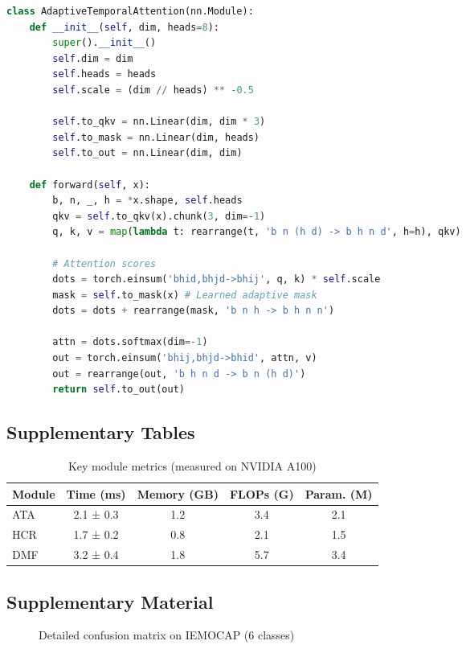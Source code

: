 \documentclass[a4paper,11pt]{article}
\begin{document}
\begin{lstlisting}[language=Python,caption=Adaptive Temporal Attention Module Excerpt]
class AdaptiveTemporalAttention(nn.Module):
    def __init__(self, dim, heads=8):
        super().__init__()
        self.dim = dim
        self.heads = heads
        self.scale = (dim // heads) ** -0.5
        
        self.to_qkv = nn.Linear(dim, dim * 3)
        self.to_mask = nn.Linear(dim, heads)
        self.to_out = nn.Linear(dim, dim)

    def forward(self, x):
        b, n, _, h = *x.shape, self.heads
        qkv = self.to_qkv(x).chunk(3, dim=-1)
        q, k, v = map(lambda t: rearrange(t, 'b n (h d) -> b h n d', h=h), qkv)
        
        # Attention scores
        dots = torch.einsum('bhid,bhjd->bhij', q, k) * self.scale
        mask = self.to_mask(x) # Learned adaptive mask
        dots = dots + rearrange(mask, 'b n h -> b h n n')
        
        attn = dots.softmax(dim=-1)
        out = torch.einsum('bhij,bhjd->bhid', attn, v)
        out = rearrange(out, 'b h n d -> b n (h d)')
        return self.to_out(out)
\end{lstlisting}

\subsection{Supplementary Tables}

\begin{table}[h]
\centering
\begin{tabular}{lcccc}
\toprule
Module & Time (ms) & Memory (GB) & FLOPs (G) & Param. (M) \\
\midrule
ATA & 2.1 ± 0.3 & 1.2 & 3.4 & 2.1 \\
HCR & 1.7 ± 0.2 & 0.8 & 2.1 & 1.5 \\
DMF & 3.2 ± 0.4 & 1.8 & 5.7 & 3.4 \\
\bottomrule
\end{tabular}
\caption{Key module metrics (measured on NVIDIA A100)}
\label{tab:modules_perf}
\end{table}

\subsection{Supplementary Material}

\begin{figure}[h]
\centering
\caption{Detailed confusion matrix on IEMOCAP (6 classes)}
\label{fig:confusion_matrix}
\end{figure}
\end{document}
